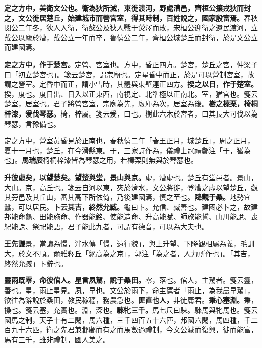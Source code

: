 \textbf{定之方中，美衛文公也。衛為狄所滅，東徙渡河，野處漕邑，齊桓公攘戎狄而封之，文公徙居楚丘，始建城市而營宮室，得其時制，百姓說之，國家殷富焉。}{\footnotesize 春秋閔公二年冬，狄人入衛，衛懿公及狄人戰于熒澤而敗，宋桓公迎衛之遺民渡河，立戴公以廬於漕，戴公立一年而卒，魯僖公二年，齊桓公城楚丘而封衛，於是文公立而建國焉。}

\textbf{定之方中，作于楚宮。}{\footnotesize 定營、宮室也。方中，昏正四方。楚宮，楚丘之宮，仲梁子曰「初立楚宮也」。箋云楚宮，謂宗廟也。定星昏中而正，於是可以營制宮室，故謂之營室。定昏中而正，謂小雪時，其體與東壁連正四方。}\textbf{揆之以日，作于楚室。}{\footnotesize 揆，度也。度日出、日入以正東西，南視定、北準極以正南北。室，猶宮也。箋云楚室，居室也。君子將營宮室，宗廟為先，廐庫為次，居室為後。}\textbf{樹之榛栗，椅桐梓漆，爰伐琴瑟。}{\footnotesize 椅，梓屬。箋云爰，曰也。樹此六木於宮者，曰其長大可伐以為琴瑟，言豫備也。}

\begin{quoting}定之方中，營室黃昏見於正南也，春秋僖二年「春王正月，城楚丘」，周之正月，夏十一月也，楚丘，在今滑縣東。于，三家詩作為，儀禮士冠禮鄭注「于，猶為也」。\textbf{馬瑞辰}椅桐梓漆皆為琴瑟之用，若榛栗則無與於琴瑟也。\end{quoting}

\textbf{升彼虛矣，以望楚矣。望楚與堂，景山與京。}{\footnotesize 虛，漕虛也。楚丘有堂邑者。景山，大山。京，高丘也。箋云自河以東，夾於濟水，文公將徙，登漕之虛以望楚丘，觀其旁邑及其丘山，審其高下所依倚，乃後建國焉，慎之至也。}\textbf{降觀于桑。}{\footnotesize 地勢宜蠶，可以居民。}\textbf{卜云其吉，終然允臧。}{\footnotesize 龜曰卜。允信、臧善也。建國必卜之，故建邦能命龜、田能施命、作器能銘、使能造命、升高能賦、師旅能誓、山川能說、喪紀能誄、祭祀能語，君子能此九者，可謂有德音，可以為大夫也。}

\begin{quoting}\textbf{王先謙}景，當讀為憬，泮水傳「憬，遠行貌」，與上升望、下降觀相屬為義，毛訓大，於文不順。爾雅釋丘「絕高為之京」，郭注「為之者，人力所作也」。「其吉，終然允臧」卜辭也。\end{quoting}

\textbf{靈雨既零，命彼倌人。星言夙駕，說于桑田。}{\footnotesize 零，落也。倌人，主駕者。箋云靈，善也。星，雨止星見。夙，早也。文公於雨下，命主駕者「雨止，為我晨早駕」，欲往為辭說於桑田，教民稼穡，務農急也。}\textbf{匪直也人，}{\footnotesize 非徒庸君。}\textbf{秉心塞淵。}{\footnotesize 秉，操也。箋云塞，充實也。淵，深也。}\textbf{騋牝三千。}{\footnotesize 馬七尺曰騋。騋馬與牝馬也。箋云國馬之制，天子十有二閑，馬六種，三千四百五十六匹，邦國六閑，馬四種，千二百九十六匹，衛之先君兼邶鄘而有之而馬數過禮制，今文公滅而復興，徙而能富，馬有三千，雖非禮制，國人美之。}


